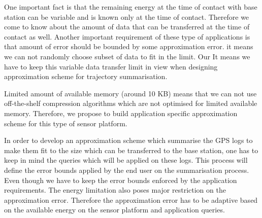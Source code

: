 \documentclass[conference]{IEEEtran}
\begin{document}
One important fact is that the remaining energy at the time of contact with base station can be variable and is known only at the time of contact. Therefore we come to know about the amount of data that can be transferred at the time of contact as well. Another important requirement of these type of applications is that amount of error should be bounded by some approximation error. it means we can not randomly choose subset of data to fit in the limit. Our It means we have to keep this variable data transfer limit in view when designing approximation scheme for trajectory summarisation.



Limited amount of available memory (around 10 KB) means that we can not use off-the-shelf compression algorithms which are not optimised for limited available memory. Therefore, we propose to build application specific approximation scheme for this type of sensor platform.\

In order to develop an approximation scheme which summarise the GPS logs to make them fit to the size which can be transferred to the base station, one has to keep in mind the queries which will be applied on these logs. This process will define the error bounds applied by the end user on the summarisation process. Even though we have to keep the error bounds enforced by the application requirements. The energy limitation also poses major restriction on the approximation error. Therefore the approximation error has to be adaptive based on the available energy on the sensor platform and application queries.
\end{document}
